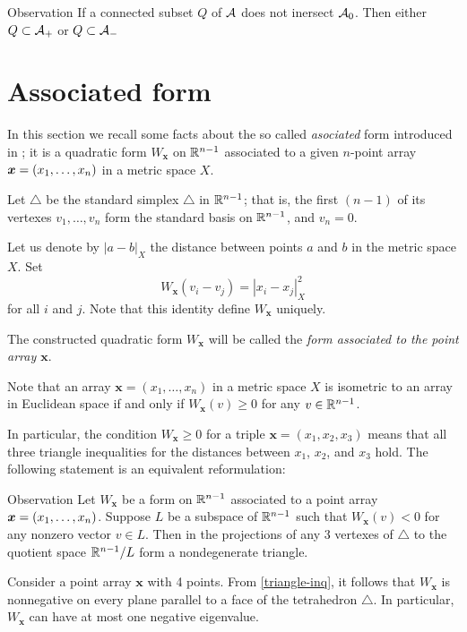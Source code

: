 \documentclass{article}
\begin{document}
\begin{thm}{Observation}\label{obs:connectedA}
If a connected subset $Q$ of $\mathcal{A}$ does not inersect $\mathcal{A}_0$.
Then either $Q\subset \mathcal{A}_+$ or $Q\subset \mathcal{A}_-$
\end{thm}


\section{Associated form}

In this section we recall some facts about the so called \emph{asociated} form introduced in \cite{petrunin-2017};
it is a quadratic form 
$W_{\bm{x}}$ on $\mathbb{R}^{n-1}$ associated
to a given $n$-point array $\bm{x}\z=(x_1,\dots,x_n)$ in a metric space $X$.

Let $\triangle$ be the standard simplex $\triangle$ in $\mathbb{R}^{n-1}$; that is, the first $(n-1)$ of its vertexes $v_1,\dots,v_n$ form the standard basis on $\mathbb{R}^{n-1}$,
 and $v_n=0$.

Let us denote by $|a-b|_X$ the distance between points $a$ and $b$ in the metric space $X$.
Set
\[W_{\bm{x}}(v_i-v_j)=|x_i-x_j|^2_X\] 
for all $i$ and $j$.
Note that this identity define $W_{\bm{x}}$ uniquely.


The constructed quadratic form $W_{\bm{x}}$ will be called the \emph{form associated to the point array $\bm{x}$}.

Note that an array $\bm{x}=(x_1,\dots,x_n)$ in a metric space $X$ is isometric to an array in Euclidean space if and only if 
$W_{\bm{x}}(v)\ge 0$
for any $v\in \mathbb{R}^{n-1}$.

In particular,  the
condition $W_{\bm{x}}\ge 0$ for a triple $\bm{x}=(x_1,x_2,x_3)$ means that 
all three triangle inequalities for the distances between $x_1$, $x_2$, and $x_3$ hold.
The following statement is an equivalent reformulation:

\begin{thm}{Observation}\label{triangle-inq}
Let $W_{\bm{x}}$ be a form on $\mathbb{R}^{n-1}$ associated to a point array $\bm{x}\z=(x_1,\dots,x_n)$.
Suppose $L$ be a subspace of $\mathbb{R}^{n-1}$ such that
$W_{\bm{x}}(v)< 0$ for any nonzero vector $v\in L$.
Then in the projections of any 3 vertexes of $\triangle$ to the quotient space $\mathbb{R}^{n-1}/L$ form a nondegenerate triangle.
\end{thm}

Consider a point array $\bm{x}$ with 4 points.
From \ref{triangle-inq}, 
it follows that $W_{\bm{x}}$ 
is nonnegative on every plane parallel to a face of the tetrahedron $\triangle$.
In particular, $W_{\bm{x}}$ can have at most one negative eigenvalue.
\end{document}
